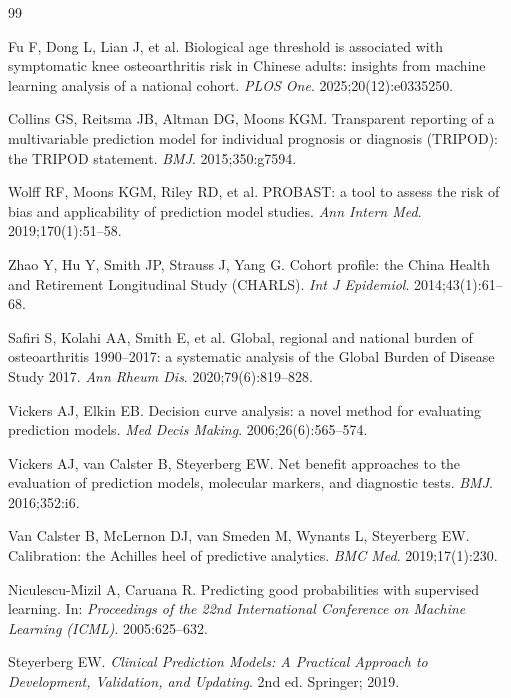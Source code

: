 \documentclass[11pt,a4paper]{article}
\begin{document}
\begin{thebibliography}{99}

 Fu F, Dong L, Lian J, et al. Biological age threshold is associated with
symptomatic knee osteoarthritis risk in Chinese adults: insights from machine learning analysis
of a national cohort. \textit{PLOS One}. 2025;20(12):e0335250.

 Collins GS, Reitsma JB, Altman DG, Moons KGM. Transparent reporting of a
multivariable prediction model for individual prognosis or diagnosis (TRIPOD): the TRIPOD statement.
\textit{BMJ}. 2015;350:g7594.

 Wolff RF, Moons KGM, Riley RD, et al. PROBAST: a tool to assess the risk of
bias and applicability of prediction model studies. \textit{Ann Intern Med}. 2019;170(1):51--58.

 Zhao Y, Hu Y, Smith JP, Strauss J, Yang G. Cohort profile: the China Health and
Retirement Longitudinal Study (CHARLS). \textit{Int J Epidemiol}. 2014;43(1):61--68.

 Safiri S, Kolahi AA, Smith E, et al. Global, regional and national burden of
osteoarthritis 1990--2017: a systematic analysis of the Global Burden of Disease Study 2017.
\textit{Ann Rheum Dis}. 2020;79(6):819--828.

 Vickers AJ, Elkin EB. Decision curve analysis: a novel method for evaluating
prediction models. \textit{Med Decis Making}. 2006;26(6):565--574.

 Vickers AJ, van Calster B, Steyerberg EW. Net benefit approaches to the
evaluation of prediction models, molecular markers, and diagnostic tests. \textit{BMJ}. 2016;352:i6.

 Van Calster B, McLernon DJ, van Smeden M, Wynants L, Steyerberg EW.
Calibration: the Achilles heel of predictive analytics. \textit{BMC Med}. 2019;17(1):230.

 Niculescu-Mizil A, Caruana R. Predicting good probabilities with
supervised learning. In: \textit{Proceedings of the 22nd International Conference on Machine
Learning (ICML)}. 2005:625--632.

 Steyerberg EW. \textit{Clinical Prediction Models: A Practical Approach
to Development, Validation, and Updating}. 2nd ed. Springer; 2019.


\end{thebibliography}
\end{document}

